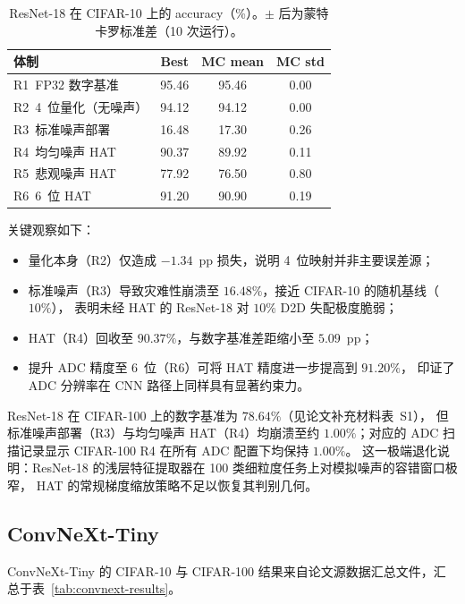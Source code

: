 \begin{table}[htbp]
\centering
\caption{ResNet-18 在 CIFAR-10 上的 accuracy（\%）。$\pm$ 后为蒙特卡罗标准差（10 次运行）。}
\label{tab:resnet18-cifar10}
\begin{tabular}{@{}lccc@{}}
\toprule
\textbf{体制} & \textbf{Best} & \textbf{MC mean} & \textbf{MC std} \\
\midrule
R1~FP32 数字基准 & 95.46 & 95.46 & 0.00 \\
R2~4~位量化（无噪声） & 94.12 & 94.12 & 0.00 \\
R3~标准噪声部署 & 16.48 & 17.30 & 0.26 \\
R4~均匀噪声 HAT & 90.37 & 89.92 & 0.11 \\
R5~悲观噪声 HAT & 77.92 & 76.50 & 0.80 \\
R6~6~位 HAT & 91.20 & 90.90 & 0.19 \\
\bottomrule
\end{tabular}
\end{table}

关键观察如下：
\begin{itemize}
    \item 量化本身（R2）仅造成 $-1.34$~pp 损失，说明 4~位映射并非主要误差源；
    \item 标准噪声（R3）导致灾难性崩溃至 $16.48\%$，接近 CIFAR-10 的随机基线（$10\%$），
    表明未经 HAT 的 ResNet-18 对 $10\%$ D2D 失配极度脆弱；
    \item HAT（R4）回收至 $90.37\%$，与数字基准差距缩小至 $5.09$~pp；
    \item 提升 ADC 精度至 6~位（R6）可将 HAT 精度进一步提高到 $91.20\%$，
    印证了 ADC 分辨率在 CNN 路径上同样具有显著约束力。
\end{itemize}

ResNet-18 在 CIFAR-100 上的数字基准为 $78.64\%$（见论文补充材料表~S1），
但标准噪声部署（R3）与均匀噪声 HAT（R4）均崩溃至约 $1.00\%$；对应的 ADC 扫描记录显示 CIFAR-100 R4 在所有 ADC 配置下均保持 $1.00\%$。
这一极端退化说明：ResNet-18 的浅层特征提取器在 100 类细粒度任务上对模拟噪声的容错窗口极窄，
HAT 的常规梯度缩放策略不足以恢复其判别几何。

\subsection{ConvNeXt-Tiny}

ConvNeXt-Tiny 的 CIFAR-10 与 CIFAR-100 结果来自论文源数据汇总文件，汇总于表~\ref{tab:convnext-results}。

